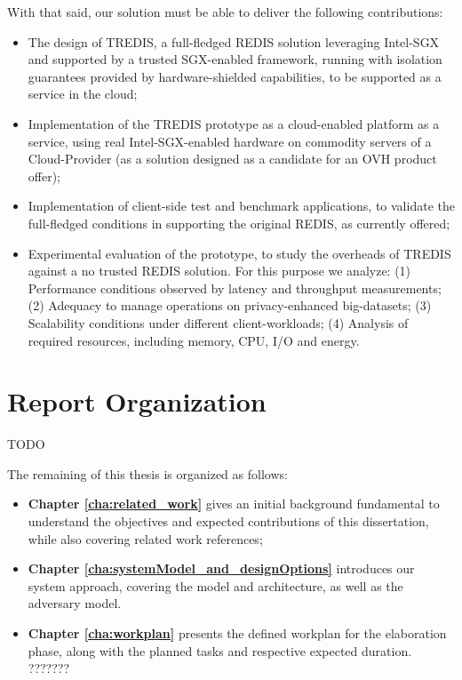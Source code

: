 With that said, our solution must be able to deliver the following contributions:
\begin{itemize}
	\item The design of TREDIS, a full-fledged REDIS solution leveraging Intel-SGX and supported by a trusted SGX-enabled framework, running with isolation guarantees provided by hardware-shielded capabilities, to be supported as a service in the cloud;
	\item Implementation of the TREDIS prototype as a cloud-enabled platform as a service, using real Intel-SGX-enabled hardware on commodity servers of a Cloud-Provider (as a solution designed as a candidate for an OVH product offer);
	\item Implementation of client-side test and benchmark applications, to validate the full-fledged conditions in supporting the original REDIS, as currently offered;
	\item Experimental evaluation of the prototype, to study the overheads of TREDIS against a no trusted REDIS solution. For this purpose we analyze: (1) Performance conditions observed by latency and throughput measurements; (2) Adequacy to manage operations on privacy-enhanced big-datasets; (3) Scalability conditions under different client-workloads; (4) Analysis of required resources, including memory, CPU, I/O and energy.
	
\end{itemize}




\section{Report Organization}

TODO

The remaining of this thesis is organized as follows:
\begin{itemize}
	\item \textbf{Chapter \ref{cha:related_work}} gives an initial background fundamental to understand the objectives and expected contributions of this dissertation, while also covering related work references; 
	\item \textbf{Chapter \ref{cha:systemModel_and_designOptions}} introduces our system approach, covering the model and architecture, as well as the adversary model.
	
	\item \textbf{Chapter \ref{cha:workplan}} presents the defined workplan for the elaboration phase, along with the planned tasks and respective expected duration. ???????
\end{itemize}
